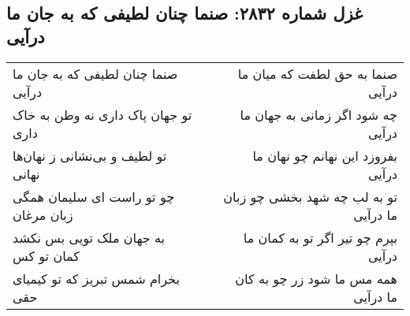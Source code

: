 \begin{center}
\section*{غزل شماره ۲۸۳۲: صنما چنان لطیفی که به جان ما درآیی}
\label{sec:2832}
\begin{longtable}{l p{0.5cm} r}
صنما چنان لطیفی که به جان ما درآیی
&&
صنما به حق لطفت که میان ما درآیی
\\
تو جهان پاک داری نه وطن به خاک داری
&&
چه شود اگر زمانی به جهان ما درآیی
\\
تو لطیف و بی‌نشانی ز نهان‌ها نهانی
&&
بفروزد این نهانم چو نهان ما درآیی
\\
چو تو راست ای سلیمان همگی زبان مرغان
&&
تو به لب چه شهد بخشی چو زبان ما درآیی
\\
به جهان ملک تویی بس نکشد کمان تو کس
&&
بپرم چو تیر اگر تو به کمان ما درآیی
\\
بخرام شمس تبریز که تو کیمیای حقی
&&
همه مس ما شود زر چو به کان ما درآیی
\\
\end{longtable}
\end{center}
